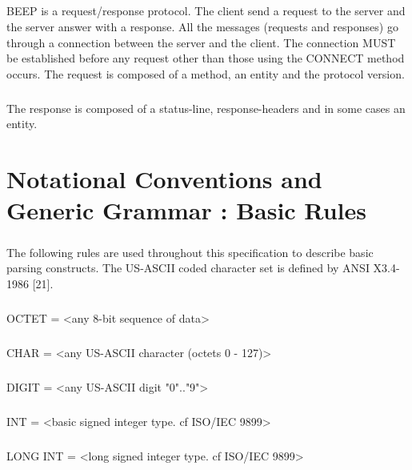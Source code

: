         \paragraph{}
   BEEP is a request/response protocol. The client send a request to the
   server and the server answer with a response. All the messages
   (requests and responses) go through a connection between the server
   and the client. The connection MUST be established before any request
   other than those using the CONNECT method occurs.
   The request is composed of a method, an entity and the protocol
   version.
        \paragraph{}
   The response is composed of a status-line, response-headers and in
   some cases an entity.


    \clearpage
\chapter{Notational Conventions and Generic Grammar : Basic Rules}
    \paragraph{}
   The following rules are used throughout this specification to
   describe basic parsing constructs. The US-ASCII coded character set
   is defined by ANSI X3.4-1986 [21].
    \paragraph{}
       OCTET          = <any 8-bit sequence of data>
    \paragraph{}
       CHAR           = <any US-ASCII character (octets 0 - 127)>
    \paragraph{}
       DIGIT          = <any US-ASCII digit "0".."9">
    \paragraph{}
       INT            = <basic signed integer type. cf ISO/IEC 9899>
    \paragraph{}
       LONG INT       = <long signed integer type. cf ISO/IEC 9899>
